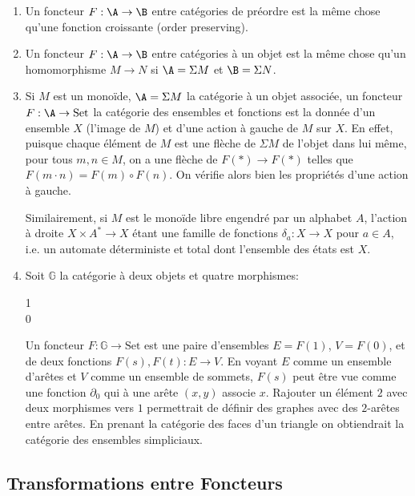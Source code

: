 \documentclass[math, info]{cours}
\begin{document}
\begin{exemple}
	\begin{enumerate}
		\item Un foncteur $F : \A \to \B$ entre catégories de préordre est la même chose qu'une fonction croissante (order preserving).
		\item Un foncteur $F : \A \to \B$ entre catégories à un objet est la même chose qu'un homomorphisme $M \to N$ si $\A = \Sigma M$ et $\B = \Sigma N$.
		\item Si $M$ est un monoïde, $\A = \Sigma M$ la catégorie à un objet associée, un foncteur $F: \A \to \mathrm{Set}$ la catégorie des ensembles et fonctions est la donnée d'un ensemble $X$ (l'image de $M$) et d'une action à gauche de $M$ sur $X$.
		      En effet, puisque chaque élément de $M$ est une flèche de $\Sigma M$ de l'objet dans lui même, pour tous $m, n \in M$, on a une flèche de $F(*)\to F(*)$ telles que $F(m\cdot n) = F(m) \circ F(n)$.
		      On vérifie alors bien les propriétés d'une action à gauche.

		      Similairement, si $M$ est le monoïde libre engendré par un alphabet $A$, l'action à droite $X \times A^{*} \to X$ étant une famille de fonctions $\delta_{a} : X \to X$ pour $a \in A$, i.e. un automate déterministe et total dont l'ensemble des états est $X$.
		\item Soit $\mathbb{G}$ la catégorie à deux objets et quatre morphismes:
		      \begin{category}[]
			      1\\
			      0
		      \end{category}
		      Un foncteur $F:\mathbb{G} \to \mathrm{Set}$ est une paire d'ensembles $E= F(1)$, $V = F(0)$, et de deux fonctions $F(s), F(t): E \to V$.
		      En voyant $E$ comme un ensemble d'arêtes et $V$ comme un ensemble de sommets, $F(s)$ peut être vue comme une fonction $\partial_{0}$ qui à une arête $(x, y)$ associe $x$.
		      Rajouter un élément $2$ avec deux morphismes vers $1$ permettrait de définir des graphes avec des $2$-arêtes entre arêtes.
		      En prenant la catégorie des faces d'un triangle on obtiendrait la catégorie des ensembles simpliciaux.
	\end{enumerate}
\end{exemple}

\subsection{Transformations entre Foncteurs}
\end{document}
